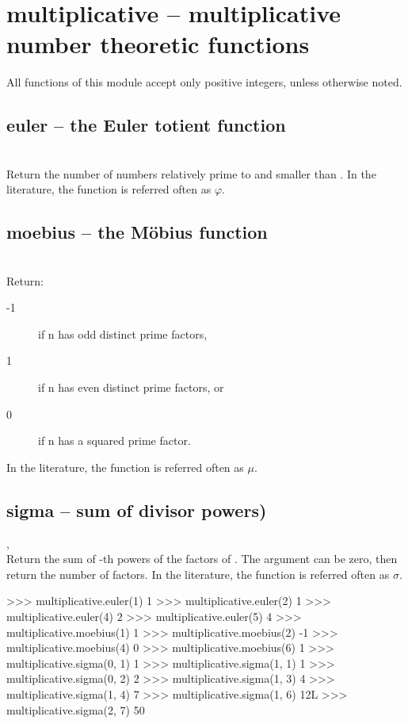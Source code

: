 

 \section{multiplicative -- multiplicative number theoretic functions}
%
All functions of this module accept only positive integers,
unless otherwise noted.
%
  \subsection{euler -- the Euler totient function}
   {%
   }{%
   }\\
   \spacing
   \quad Return the number of numbers relatively prime to 
   and smaller than .  In the literature, the function is
   referred often as \(\varphi\).

  \subsection{moebius -- the M\"obius function}
   {%
   }{%
   }\\
   \spacing
   \quad Return:
   \begin{description}
   \item[-1] if n has odd distinct prime factors,
   \item[1] if n has even distinct prime factors, or
   \item[0] if n has a squared prime factor.
   \end{description}
   In the literature, the function is referred often as \(\mu\).

  \subsection{sigma -- sum of divisor powers)}
   {%
     ,\ %
   }{%
   }\\
   \spacing
   Return the sum of -th powers of the factors of .
   The argument  can be zero, then return the number of factors.
   In the literature, the function is referred often as \(\sigma\).
%
\begin{ex}
>>> multiplicative.euler(1)
1
>>> multiplicative.euler(2)
1
>>> multiplicative.euler(4)
2
>>> multiplicative.euler(5)
4
>>> multiplicative.moebius(1)
1
>>> multiplicative.moebius(2)
-1
>>> multiplicative.moebius(4)
0
>>> multiplicative.moebius(6)
1
>>> multiplicative.sigma(0, 1)
1
>>> multiplicative.sigma(1, 1)
1
>>> multiplicative.sigma(0, 2)
2
>>> multiplicative.sigma(1, 3)
4
>>> multiplicative.sigma(1, 4)
7
>>> multiplicative.sigma(1, 6)
12L
>>> multiplicative.sigma(2, 7)
50
\end{ex}%
\C



